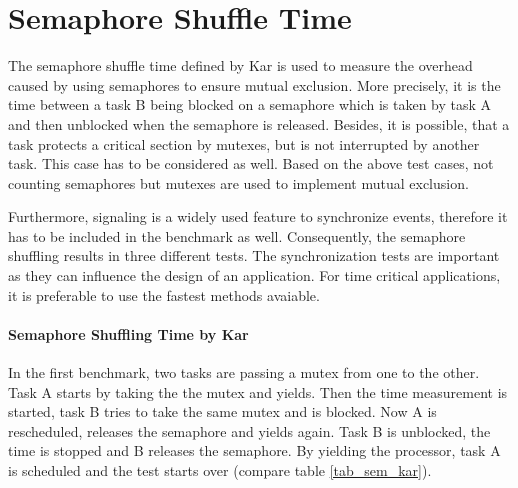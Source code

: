 \section{Semaphore Shuffle Time}
The semaphore shuffle time defined by Kar is used to measure the overhead caused by using semaphores to ensure mutual exclusion.
More precisely, it is the time between a task B being blocked on a semaphore which is taken by task A and then unblocked when the semaphore is released.  
Besides, it is possible, that a task protects a critical section by mutexes, but is not interrupted by another task.
This case has to be considered as well.
Based on the above test cases, not counting semaphores but mutexes are used to implement mutual exclusion.
\par
Furthermore, signaling is a widely used feature to synchronize events, therefore it has to be included in the benchmark as well.  
Consequently, the semaphore shuffling results in three different tests.
The synchronization tests are important as they can influence the design of an application.
For time critical applications, it is preferable to use the fastest methods avaiable.

\paragraph{Semaphore Shuffling Time by Kar}
In the first benchmark, two tasks are passing a mutex from one to the other.
Task A starts by taking the the mutex and yields.
Then the time measurement is started, task B tries to take the same mutex and is blocked.
Now A is rescheduled, releases the semaphore and yields again.
Task B is unblocked, the time is stopped and B releases the semaphore.
By yielding the processor, task A is scheduled and the test starts over (compare table \ref{tab_sem_kar}).

